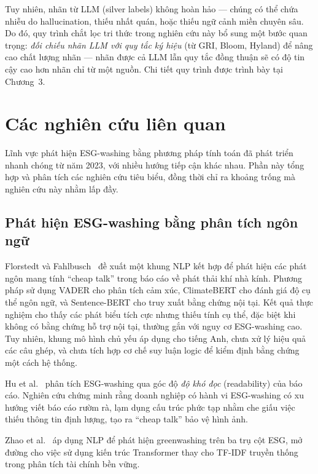 Tuy nhiên, nhãn từ LLM (silver labels) không hoàn hảo --- chúng có thể chứa nhiễu do hallucination, thiếu nhất quán, hoặc thiếu ngữ cảnh miền chuyên sâu. Do đó, quy trình chắt lọc tri thức trong nghiên cứu này bổ sung một bước quan trọng: \textit{đối chiếu nhãn LLM với quy tắc ký hiệu} (từ GRI, Bloom, Hyland) để nâng cao chất lượng nhãn --- nhãn được cả LLM lẫn quy tắc đồng thuận sẽ có độ tin cậy cao hơn nhãn chỉ từ một nguồn. Chi tiết quy trình được trình bày tại Chương~3.


\section{Các nghiên cứu liên quan}
\label{sec:related_works}

Lĩnh vực phát hiện ESG-washing bằng phương pháp tính toán đã phát triển nhanh chóng từ năm 2023, với nhiều hướng tiếp cận khác nhau. Phần này tổng hợp và phân tích các nghiên cứu tiêu biểu, đồng thời chỉ ra khoảng trống mà nghiên cứu này nhằm lấp đầy.


\subsection{Phát hiện ESG-washing bằng phân tích ngôn ngữ}
\label{subsec:rw_linguistic}

Florstedt và Fahlbusch~\cite{florstedt2025detecting} đề xuất một khung NLP kết hợp để phát hiện các phát ngôn mang tính ``cheap talk'' trong báo cáo về phát thải khí nhà kính. Phương pháp sử dụng VADER cho phân tích cảm xúc, ClimateBERT cho đánh giá độ cụ thể ngôn ngữ, và Sentence-BERT cho truy xuất bằng chứng nội tại. Kết quả thực nghiệm cho thấy các phát biểu tích cực nhưng thiếu tính cụ thể, đặc biệt khi không có bằng chứng hỗ trợ nội tại, thường gắn với nguy cơ ESG-washing cao. Tuy nhiên, khung mô hình chủ yếu áp dụng cho tiếng Anh, chưa xử lý hiệu quả các câu ghép, và chưa tích hợp cơ chế suy luận logic để kiểm định bằng chứng một cách hệ thống.

Hu et al.~\cite{su16062571} phân tích ESG-washing qua góc độ \textit{độ khó đọc} (readability) của báo cáo. Nghiên cứu chứng minh rằng doanh nghiệp có hành vi ESG-washing có xu hướng viết báo cáo rườm rà, lạm dụng cấu trúc phức tạp nhằm che giấu việc thiếu thông tin định lượng, tạo ra ``cheap talk'' bảo vệ hình ảnh.

Zhao et al.~\cite{zhao2023detecting} áp dụng NLP để phát hiện greenwashing trên ba trụ cột ESG, mở đường cho việc sử dụng kiến trúc Transformer thay cho TF-IDF truyền thống trong phân tích tài chính bền vững.


